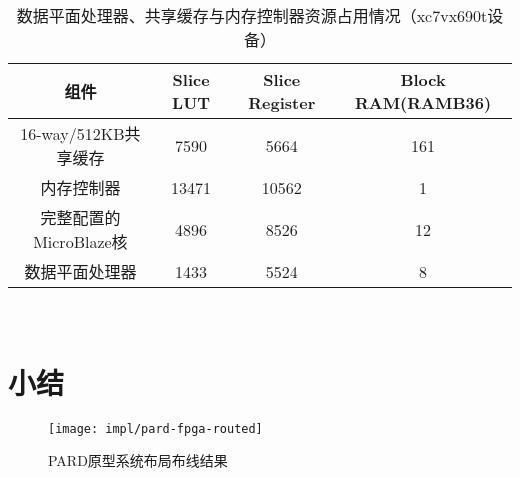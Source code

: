 \begin{table}[htb]
  \centering
  \begin{minipage}[t]{0.9\linewidth}
  \caption{数据平面处理器、共享缓存与内存控制器资源占用情况（xc7vx690t设备）}
  \label{tab:pard-dp-resource}
    \begin{tabular*}{\linewidth}{cccc}
      \toprule[1.5pt]
      \textbf{组件} & \textbf{Slice LUT} & \textbf{Slice Register} & \textbf{Block RAM(RAMB36)} \\
      \midrule[1pt]
      16-way/512KB共享缓存    &  7590       &  5664            &  161               \\
      内存控制器              &  13471      &  10562           &  1                 \\
      完整配置的MicroBlaze核  &  4896       &  8526            &  12                \\
      \hline
      数据平面处理器          &  1433       &  5524            &  8                 \\
      \bottomrule[1.5pt]
    \end{tabular*}\\[2pt]
  \end{minipage}
\end{table}


\section{小结}


\begin{figure}[htb]
  \centering
  \texttt{[image: impl/pard-fpga-routed]}
  \caption{PARD原型系统布局布线结果}
  \label{fig:pard-fpga-routed}
\end{figure}
